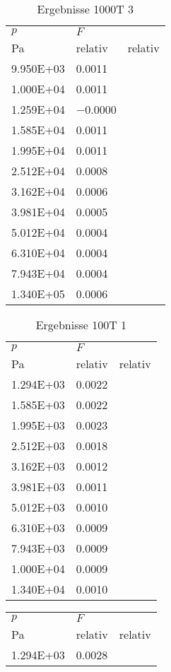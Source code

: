 \begin{table}
\begin{tabular}{l l }
\toprule
$p$&$F$\\
 Pa & relativ & relativ\\\midrule
\num{9.950E+03}&\num{0.0011}\\
\num{1.000E+04}&\num{0.0011}\\
\num{1.259E+04}&\num{-0.0000}\\
\num{1.585E+04}&\num{0.0011}\\
\num{1.995E+04}&\num{0.0011}\\
\num{2.512E+04}&\num{0.0008}\\
\num{3.162E+04}&\num{0.0006}\\
\num{3.981E+04}&\num{0.0005}\\
\num{5.012E+04}&\num{0.0004}\\
\num{6.310E+04}&\num{0.0004}\\
\num{7.943E+04}&\num{0.0004}\\
\num{1.340E+05}&\num{0.0006}\\
\bottomrule
\end{tabular}\caption{Ergebnisse 1000T 3}\end{table}\begin{table}\begin{tabular}{l l }
\toprule
$p$&$F$\\
 Pa & relativ & relativ\\\midrule
\num{1.294E+03}&\num{0.0022}\\
\num{1.585E+03}&\num{0.0022}\\
\num{1.995E+03}&\num{0.0023}\\
\num{2.512E+03}&\num{0.0018}\\
\num{3.162E+03}&\num{0.0012}\\
\num{3.981E+03}&\num{0.0011}\\
\num{5.012E+03}&\num{0.0010}\\
\num{6.310E+03}&\num{0.0009}\\
\num{7.943E+03}&\num{0.0009}\\
\num{1.000E+04}&\num{0.0009}\\
\num{1.340E+04}&\num{0.0010}\\
\bottomrule
\end{tabular}\caption{Ergebnisse 100T 1}\end{table}\begin{table}\begin{tabular}{l l }
\toprule
$p$&$F$\\
 Pa & relativ & relativ\\\midrule
\num{1.294E+03}&\num{0.0028}\\

\end{tabular}
\end{table}
